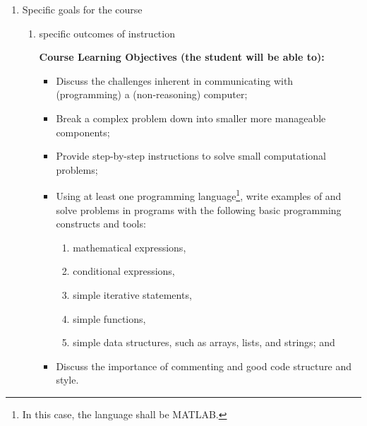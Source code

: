 \begin{enumerate}[1.]
\begin{enumerate}[a.]
\item indicate whether a required, elective, or selected elective\\ %
  {\bfseries
    Required\footnote{Some CSC majors can take this option if starting in Engineering and switching to CSC. CSC106 and CSC107 can be substituted for CSC110 and CSC110L.}
  }

\end{enumerate}

\item Specific goals for the course
\begin{enumerate}
\item specific outcomes of instruction\\ %
  {\bfseries
    Course Learning Objectives (the student will be able to):
    \begin{itemize}
    \item Discuss the challenges inherent in communicating with (programming) a 
(non-reasoning) computer;
       \item Break a complex problem down into smaller more manageable components;
       \item Provide step-by-step instructions to solve small computational problems;
       \item Using at least one programming language\footnote{In this case, the language shall be MATLAB.}, 
       write examples of and solve problems in programs with the following basic programming constructs and tools:
       \begin{enumerate}
       \item mathematical expressions,
       \item conditional expressions,
       \item simple iterative statements,
       \item simple functions,
       \item simple data structures, such as arrays, lists, and strings; and
       \end{enumerate}
       \item Discuss the importance of commenting and good code structure and style.
    \end{itemize}
  }


\end{enumerate}
\end{enumerate}
